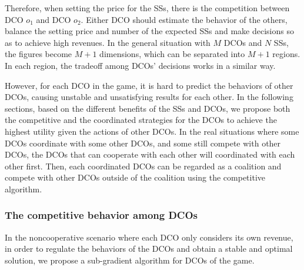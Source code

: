 \documentclass[twocolumn,10pt]{IEEEtran}
\begin{document}
Therefore, when setting the price for the SSs, there is the competition between DCO $o_1$ and DCO $o_2$. Either DCO should estimate the behavior of the others, balance the setting price and number of the expected SSs and make decisions so as to achieve high revenues. In the general situation with $M$ DCOs and $N$ SSs, the figures become $M+1$ dimensions, which can be separated into $M+1$ regions. In each region, the tradeoff among DCOs' decisions works in a similar way.

However, for each DCO in the game, it is hard to predict the behaviors of other DCOs, causing unstable and unsatisfying results for each other. In the following sections, based on the different benefits of the SSs and DCOs, we propose both the competitive and the coordinated strategies for the DCOs to achieve the highest utility given the actions of other DCOs. In the real situations where some DCOs coordinate with some other DCOs, and some still compete with other DCOs, the DCOs that can cooperate with each other will coordinated with each other first. Then, each coordinated DCOs can be regarded as a coalition and compete with other DCOs outside of the coalition using the competitive algorithm.



\vspace{0.5 cm}

\subsubsection{The competitive behavior among DCOs}

In the noncooperative scenario where each DCO only considers its own revenue, in order to regulate the behaviors of the DCOs and obtain a stable and optimal solution, we propose a sub-gradient algorithm for DCOs of the game.
\end{document}
